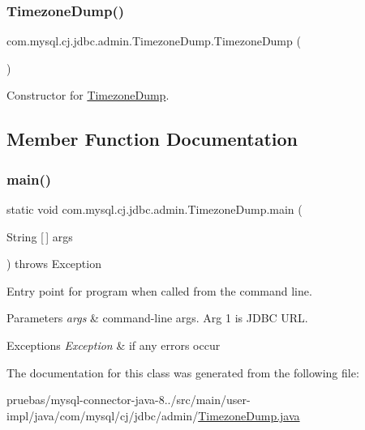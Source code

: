 \subsubsection{\texorpdfstring{Timezone\+Dump()}{TimezoneDump()}}
{\footnotesize\ttfamily com.\+mysql.\+cj.\+jdbc.\+admin.\+Timezone\+Dump.\+Timezone\+Dump (\begin{DoxyParamCaption}{ }\end{DoxyParamCaption})}

Constructor for \mbox{\hyperlink{classcom_1_1mysql_1_1cj_1_1jdbc_1_1admin_1_1_timezone_dump}{Timezone\+Dump}}. 

\subsection{Member Function Documentation}
\mbox{\label{classcom_1_1mysql_1_1cj_1_1jdbc_1_1admin_1_1_timezone_dump_a49fa078091ac273b24d35f0077227ab4}} 
\subsubsection{\texorpdfstring{main()}{main()}}
{\footnotesize\ttfamily static void com.\+mysql.\+cj.\+jdbc.\+admin.\+Timezone\+Dump.\+main (\begin{DoxyParamCaption}\item[{String \mbox{[}$\,$\mbox{]}}]{args }\end{DoxyParamCaption}) throws Exception\hspace{0.3cm}{\ttfamily [static]}}

Entry point for program when called from the command line.


\begin{DoxyParams}{Parameters}
{\em args} & command-\/line args. Arg 1 is J\+D\+BC U\+RL. \\
\hline
\end{DoxyParams}

\begin{DoxyExceptions}{Exceptions}
{\em Exception} & if any errors occur \\
\hline
\end{DoxyExceptions}


The documentation for this class was generated from the following file\+:\begin{DoxyCompactItemize}
\item 
pruebas/mysql-\/connector-\/java-\/8../src/main/user-\/impl/java/com/mysql/cj/jdbc/admin/\mbox{\hyperlink{_timezone_dump_8java}{Timezone\+Dump.\+java}}\end{DoxyCompactItemize}
